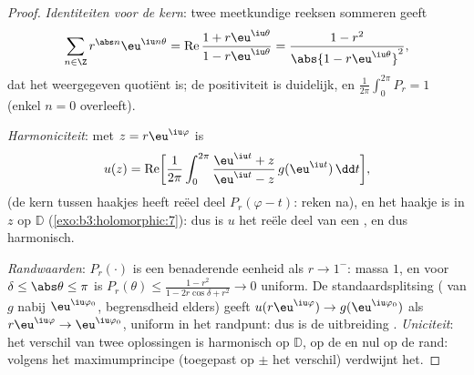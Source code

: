 \begin{proof}
\emph{Identiteiten voor de kern}: twee meetkundige reeksen
sommeren geeft
\[
\sum_{n\in\Z}r^{\abs n}\eu^{\iu n\theta}
= \operatorname{Re}\frac{1 + r\eu^{\iu\theta}}{1 -
r\eu^{\iu\theta}}
= \frac{1 - r^2}{\abs{1 - r\eu^{\iu\theta}}^2},
\]
dat het weergegeven quotiënt is; de positiviteit is duidelijk, en
$\frac1{2\pi}\int_0^{2\pi}P_r = 1$ (enkel $n = 0$ overleeft).

\emph{Harmoniciteit}: met $z = r\eu^{\iu\varphi}$ is
\[
u(z) = \operatorname{Re}\biggl[\frac1{2\pi}\int_0^{2\pi}
\frac{\eu^{\iu t} + z}{\eu^{\iu t} - z}\,
g(\eu^{\iu t})\,\dd t\biggr],
\]
(de kern tussen haakjes heeft reëel deel $P_r(\varphi - t)$:
reken na), en het haakje is  in $z$ op $\mathbb D$
(\cref{exo:b3:holomorphic:7}): dus is $u$ het reële deel van een
, en dus harmonisch.

\emph{Randwaarden}: $P_r(\cdot)$ is een benaderende eenheid als
$r \to 1^-$: massa $1$, en voor $\delta \leq \abs\theta \leq \pi$
is $P_r(\theta) \leq \frac{1 - r^2}{1 - 2r\cos\delta + r^2} \to
0$ uniform. De standaardsplitsing ( van $g$ nabij
$\eu^{\iu\varphi_0}$, begrensdheid elders) geeft
$u(r\eu^{\iu\varphi}) \to g(\eu^{\iu\varphi_0})$ als
$r\eu^{\iu\varphi} \to \eu^{\iu\varphi_0}$, uniform in het
randpunt: dus is de uitbreiding . \emph{Uniciteit}: het
verschil van twee oplossingen is harmonisch op $\mathbb D$,
 op de  en nul op de rand: volgens het
maximumprincipe (toegepast op $\pm$ het verschil) verdwijnt het.
\end{proof}

